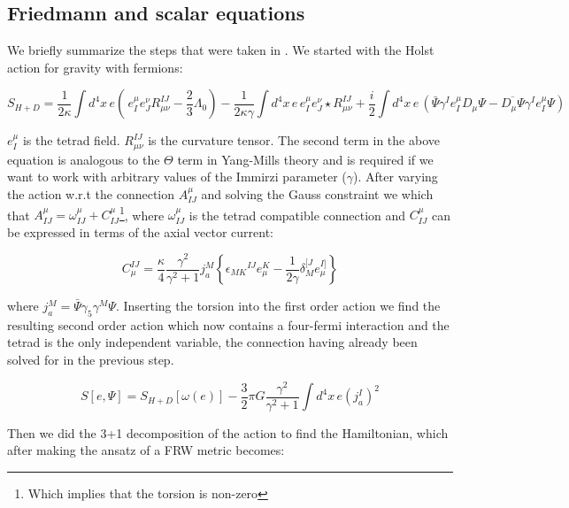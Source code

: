 \begin{doublespace}
\section{Friedmann and scalar equations}

We briefly summarize the steps that were taken in
\cite{Alexander2006Gravity}. We started with the Holst action for gravity
with fermions:

\begin{equation}
    S_{H+D} = \frac{1}{2\kappa}\int d^{4}x\,e(\,e^{\mu}_{I}e^{\nu}_{J}R^{IJ}_{\mu\nu} - \frac{2}{3}\Lambda_0) -
    \frac{1}{2\kappa\gamma}\int d^{4}x\,e\,e^{\mu}_{I}e^{\nu}_{J}\star R^{IJ}_{\mu\nu} + \frac{i}{2}\int d^{4}x\,e\,(\bar{\Psi}\gamma^{I}e^{\mu}_{I}D_{\mu}\Psi -
    \overline{D_{\mu}\Psi}\gamma^{I}e^{\mu}_{I}\Psi)
\end{equation}

$e^\mu_I$ is the tetrad field. $R_{\mu\nu}^{IJ}$ is the curvature
tensor. The second term in the above equation is analogous to the
$\Theta$ term in Yang-Mills theory and is required if we want to
work with arbitrary values of the Immirzi parameter ($\gamma$).
After varying the action w.r.t the connection $A^\mu_{IJ}$ and
solving the Gauss constraint we which that $A^\mu_{IJ} =
\omega^\mu_{IJ} + C^\mu_{IJ}$\footnote{Which implies that the
torsion is non-zero}, where $\omega^\mu_{IJ}$ is the tetrad
compatible connection and $C^\mu_{IJ}$ can be expressed in terms of
the axial vector current:

\begin{equation}
    C_\mu^{IJ} = \frac{\kappa}{4}\frac{\gamma^2}{\gamma^2 + 1}j^M_a\left \{ \epsilon_{MK}{}^{IJ}e^K_\mu
            - \frac{1}{2\gamma}\delta^{[J}_M e^{I]}_\mu \right\}
\end{equation}

where $ j^M_a = \bar\Psi\gamma_5\gamma^M\Psi$. Inserting the torsion
into the first order action we find the resulting second order
action which now contains a four-fermi interaction and the tetrad is
the only independent variable, the connection having already been
solved for in the previous step.

\begin{equation}
    S[e,\Psi] = S_{H+D}[\omega(e)] -\frac{3}{2}\pi G \frac{\gamma^{2}}{\gamma^{2}+1} \int d^{4}x\,e (j_a^I)^2
\end{equation}

Then we did the 3+1 decomposition of the action to find the
Hamiltonian, which after making the ansatz of a FRW metric becomes:


\end{doublespace}
